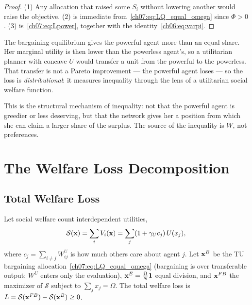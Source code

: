 \documentclass[../structural_economics_book.tex]{subfiles}
\begin{document}
\begin{proof}
(1) Any allocation that raised some $S_i$ without lowering another would raise the objective. (2) is immediate from~\eqref{ch07:eq:LQ_equal_omega} since $\Phi > 0$. (3) is~\eqref{ch07:eq:Lpower}, together with the identity~\eqref{ch06:eq:varpi}.
\end{proof}

\begin{intuition}
The bargaining equilibrium gives the powerful agent more than an equal share. Her marginal utility is then lower than the powerless agent's, so a utilitarian planner with concave $U$ would transfer a unit from the powerful to the powerless. That transfer is not a Pareto improvement --- the powerful agent loses --- so the loss is \textit{distributional}: it measures inequality through the lens of a utilitarian social welfare function.

This is the structural mechanism of inequality: not that the powerful agent is greedier or less deserving, but that the network gives her a position from which she can claim a larger share of the surplus. The source of the inequality is $W$, not preferences.
\end{intuition}


\section{The Welfare Loss Decomposition}
\label{ch07:sec:welfare_loss}

\subsection{Total Welfare Loss}

Let social welfare count interdependent utilities,
\begin{equation*}
\mathcal{S}(\mathbf{x}) = \sum_i V_i(\mathbf{x}) = \sum_j (1 + \gamma_U c_j)\,U(x_j),
\end{equation*}
where $c_j = \sum_{i \neq j} W^U_{ij}$ is how much others care about agent $j$. Let $\mathbf{x}^B$ be the TU bargaining allocation~\eqref{ch07:eq:LQ_equal_omega} (bargaining is over transferable output; $W^U$ enters only the evaluation), $\mathbf{x}^E = \frac{\Omega}{N}\mathbf{1}$ equal division, and $\mathbf{x}^{FB}$ the maximizer of $\mathcal{S}$ subject to $\sum_j x_j = \Omega$. The total welfare loss is $L = \mathcal{S}(\mathbf{x}^{FB}) - \mathcal{S}(\mathbf{x}^B) \geq 0$.
\end{document}
